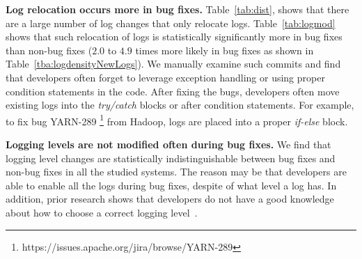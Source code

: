 
\textbf{Log relocation occurs more in bug fixes.} Table~\ref{tab:dist}, shows that there are a large number of log changes that only relocate logs. Table~\ref{tab:logmod} shows that such relocation of logs is statistically significantly more in bug fixes than non-bug fixes ($2.0$ to $4.9$ times more likely in bug fixes as shown in Table~\ref{tba:logdensityNewLogs}). We manually examine such commits and find that developers often forget to leverage exception handling or using proper condition statements in the code. After fixing the bugs, developers often move existing logs into the \emph{try/catch} blocks or after condition statements. For example, to fix bug YARN-289 \footnote{https://issues.apache.org/jira/browse/YARN-289} from Hadoop, logs are placed into a proper \emph{if-else} block.

\textbf{Logging levels are not modified often during bug fixes.} We find that logging level changes are statistically indistinguishable between bug fixes and non-bug fixes in all the studied systems. The reason may be that developers are able to enable all the logs during bug fixes, despite of what level a log has. In addition, prior research shows that developers do not have a good knowledge about how to choose a correct logging level~\cite{Characterizinglogs}. 



